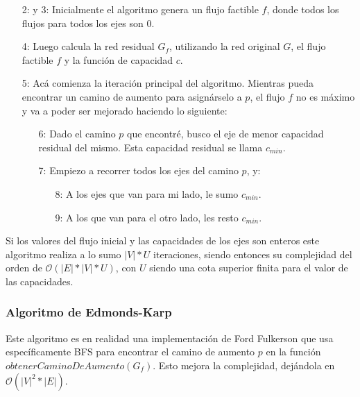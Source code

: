 \begin{enumerate}
\item [2: y 3:] Inicialmente el algoritmo genera un flujo factible $f$, donde todos los flujos para todos los ejes son $0$.
\item [4:] Luego calcula la red residual $G_f$, utilizando la red original $G$, el flujo factible $f$ y la funci\'on de capacidad $c$.
\item [5:] Ac\'a comienza la iteraci\'on principal del algoritmo. Mientras pueda encontrar un camino de aumento para asign\'arselo a $p$, el flujo $f$ no es m\'aximo y va a poder ser mejorado haciendo lo siguiente:
  \begin{enumerate}
  \item [6:] Dado el camino $p$ que encontr\'e, busco el eje de menor capacidad residual del mismo. Esta capacidad residual se llama $c_{min}$.
  \item [7:] Empiezo a recorrer todos los ejes del camino $p$, y:
    \begin{enumerate}
      \item [8:] A los ejes que van para mi lado, le sumo $c_{min}$.
      \item [9:] A los que van para el otro lado, les resto $c_{min}$.
    \end{enumerate}
  \end{enumerate}
\end{enumerate}

Si los valores del flujo inicial y las capacidades de los ejes son enteros este algoritmo realiza a lo sumo $|V| * U$ iteraciones, siendo entonces su complejidad del orden de $\mathcal{O}(|E| * |V| * U)$, con $U$ siendo una cota superior finita para el valor de las capacidades.

\subsubsection{Algoritmo de Edmonds-Karp}

Este algoritmo es en realidad una implementaci\'on de Ford Fulkerson que usa espec\'ificamente BFS para encontrar el camino de aumento $p$ en la funci\'on $obtenerCaminoDeAumento(G_f)$. Esto mejora la complejidad, dej\'andola en $\mathcal{O}(|V|^2 * |E|)$.
